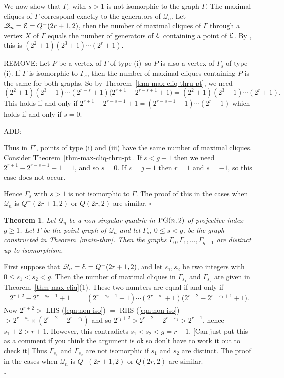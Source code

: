 \documentclass[12pt]{article}
\newtheorem{theorem}{Theorem}[section]
\newenvironment{proof}{\noindent{\bf Proof}\hspace{0.5em}}
    { \null  \hfill $\square$ \par}
\newcommand\E{{\cal E}}
\newcommand{\Q}{\mathscr Q}
\newcommand\PG{{\rm PG}}
\newcommand{\Label}{\label}
\newcommand\red[1]{{\color{red} #1}}
\newcommand\blue[1]{{\color{blue} #1}}
\begin{document}
\begin{proof}
We now show that $\Gamma_s$ with $s>1$ is not isomorphic to  the graph $\Gamma$. The maximal cliques of $\Gamma$ correspond exactly to the generators of $\Q_n$. 
Let $\Q_n=\E=Q^-(2r+1,2)$, then the number of maximal cliques of $\Gamma$ through a vertex $X$ of $\Gamma$ equals the number of generators of $\E$ containing a point of $\E$. By \cite[Theorem 22.4.7]{HT}, this is $(2^2+1)(2^3+1)\cdots(2^{r}+1)$. 

\blue{REMOVE: Let $P$ be a vertex of   $\Gamma$ of type (i), so $P$ is also a vertex of $\Gamma_s$ of type (i). If $\Gamma$ is isomorphic to $\Gamma_s$, then the number of maximal cliques containing $P$ is the same for both graphs. So by Theorem~\ref{thm-max-cliq-thru-pt}, we need
$$   (2^2+1)(2^3+1)\cdots(2^{r-s}+1)\big(2^{r+1}-2^{r-s+1}+1\big)
=(2^2+1)(2^3+1)\cdots(2^{r}+1).$$
This holds if and only if $2^{r+1}-2^{r-s+1}+1=(2^{r-s+1}+1)\cdots(2^{r}+1)$ which holds if and only if $s=0$. }

\red{ADD:

Thus in $\Gamma'$, points of type (i) and (iii) have the same number of maximal cliques. Consider  Theorem~\ref{thm-max-cliq-thru-pt}. If $s<g-1$ then we need $2^{r+1}-2^{r-s+1}+1=1$, and so $s=0$.  If $s=g-1$ then $r=1$ and $s=-1$, so this case does not occur.}


Hence $\Gamma_s$ with $s>1$ is not isomorphic to $\Gamma$. The proof of this in the cases when $\Q_n$ is $Q^+(2r+1,2)$ or $Q(2r,2)$ are similar. 
\end{proof}


\begin{theorem}  Let $\Q_n$ be a non-singular quadric in $\PG(n,2)$ of projective index $g\geq1$. Let $\Gamma$ be the point-graph of $\Q_n$ and let $\Gamma_s$, $0\leq s<g$,
 be the graph constructed in Theorem~\ref{main-thm}.
Then the graphs
$\Gamma_0,\Gamma_1,\ldots,\Gamma_{g-1}$ are distinct up to isomorphism.
\end{theorem}

\begin{proof} First suppose that $\Q_n=\E=Q^-(2r+1,2)$, and let $s_1,s_2$ be two integers with $0\leq s_1<s_2<g$. Then the number of maximal cliques in $\Gamma_{s_1}$ and $\Gamma_{s_2}$ are given in Theorem~\ref{thm-max-cliq}(1). These two numbers are equal if and only if 
\begin{eqnarray}
2^{r+2}-2^{r-s_2+1}+1&=&(2^{r-s_2+1}+1)\cdots(2^{r-s_1}+1)
\big( 2^{r+2}-2^{r-s_1+1}+1\big).\Label{eqn:non-iso}
\end{eqnarray}
\red{Now $2^{r+2}>$ LHS (\ref{eqn:non-iso}) $=$  RHS (\ref{eqn:non-iso})  $>2^{r-s_1}\times(2^{r+2}-2^{r-s_1})$
and so $2^{s_1+2}>2^{r+2}-2^{r-s_1}>2^{r+1}$, hence $s_1+2>r+1$.  However, this contradicts $s_1<s_2<g=r-1$. [Can just put this as a comment if you think the argument is ok so don't have to work it out to check it]
}
Thus $\Gamma_{s_1}$ and $\Gamma_{s_2}$ are not isomorphic  if  $s_1$ and $s_2$ are distinct. The proof  in the cases when $\Q_n$ is $Q^+(2r+1,2)$ or $Q(2r,2)$ are similar. 

\end{proof}
\end{document}
